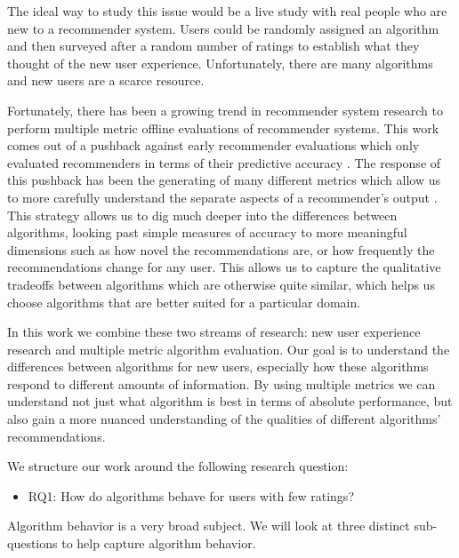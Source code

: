 \documentclass[letterpaper]{sig-alternate}
\begin{document}
  The ideal way to study this issue would be a live study with real people who are new to a recommender system.
  Users could be randomly assigned an algorithm and then surveyed after a random number of ratings to establish what they thought of the new user experience. 
  Unfortunately, there are many algorithms and new users are a scarce resource.
 
  Fortunately, there has been a growing trend in recommender system research to perform multiple metric offline evaluations of recommender systems.
  This work comes out of a pushback against early recommender evaluations which only evaluated recommenders in terms of their predictive accuracy \cite{accurateIsNotEnough}.
  The response of this pushback has been the generating of many different metrics which allow us to more carefully understand the separate aspects of a recommender's output \cite{LathiaTemporal, CremonesiTopN, zieglerDiversity}.
  This strategy allows us to dig much deeper into the differences between algorithms, looking past simple measures of accuracy to more meaningful dimensions such as how novel the recommendations are, or how frequently the recommendations change for any user.
  This allows us to capture the qualitative tradeoffs between algorithms which are otherwise quite similar, which helps us choose algorithms that are better suited for a particular domain.

  In this work we combine these two streams of research: new user experience research and multiple metric algorithm evaluation.
  Our goal is to understand the differences between algorithms for new users, especially how these algorithms respond to different amounts of information.
  By using multiple metrics we can understand not just what algorithm is best in terms of absolute performance, but also gain a more nuanced understanding of the qualities of different algorithms' recommendations.

  We structure our work around the following research question:
  \begin{itemize}
    \item RQ1: How do algorithms behave for users with few ratings?
  \end{itemize}
  Algorithm behavior is a very broad subject.
  We will look at three distinct sub-questions to help capture algorithm behavior.
\end{document}
